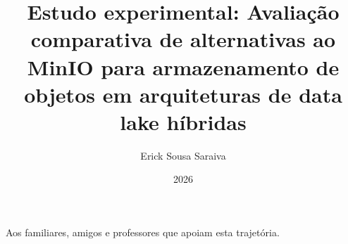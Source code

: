 \documentclass[pt,oneside,openany,onehalfspacing,bsc]{ifbclass/ifbclass}
\title{Estudo experimental: Avaliação comparativa de alternativas ao MinIO para armazenamento de objetos em arquiteturas de data lake híbridas}
\date{2026}
\author{Erick Sousa Saraiva}
\begin{document}
  
  \frontmatter
  
  \frontpage
  
  \presentationpage
  
  \begin{fichacatalografica}
    \FakeFichaCatalografica %
  \end{fichacatalografica}
  
  \banca
  
  \begin{dedicatory}
  Aos familiares, amigos e professores que apoiam esta trajetória.
  \end{dedicatory}
  
  \acknowledgements
  
  
  \resumo
  {\parindent0pt
    
  }
  
  \abstract
  {\parindent0pt
    
  }
  
  \listoffigures
  
  \lstlistoflistings
  
  \listoftables
  
  \listofacronyms
  
  
  \tableofcontents
  
  \mainmatter
  
  
  
  
  
  

  \appendix
  
  
  
  \begin{references}
    
  \end{references}
  
  
\end{document}
